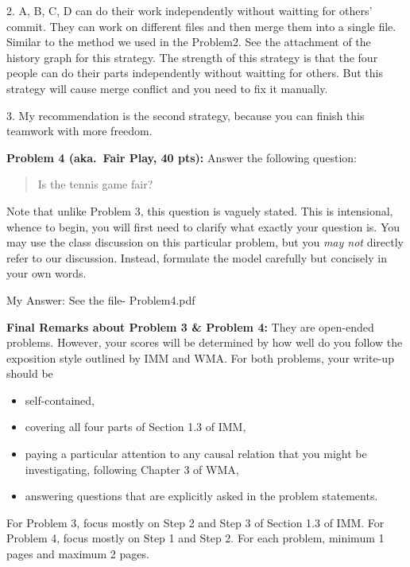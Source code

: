 \documentclass[12pt]{article}
\begin{document}
2. A, B, C, D can do their work independently without waitting for others' commit. They can work on different files and then merge them into a single file. Similar to the method we used in the Problem2. See the attachment of the history graph for this strategy. The strength of this strategy is that the four people can do their parts independently without waitting for others. But this strategy will cause merge conflict and you need to fix it manually.

3. My recommendation is the second strategy, because you can finish this teamwork with more freedom.

\vskip0.25in
\noindent\textbf{Problem 4 (aka.\ Fair Play, 40 pts):}
Answer the following question:
\begin{verse}
Is the tennis game fair?
\end{verse}
Note that unlike Problem 3, this question is vaguely stated.
This is intensional, whence to begin, you will first need to clarify
what exactly your question is.
You may use the class discussion on this particular 
problem, but you \emph{may not} directly refer to our 
discussion.  Instead, formulate the model carefully but concisely in 
your own words.   

My Answer: See the file- Problem4.pdf

\vskip0.25in
\noindent\textbf{Final Remarks about Problem 3 \& Problem 4:} 
They are open-ended problems.  However, your scores will be determined
by how well do you follow the exposition style outlined by IMM and
WMA.  For both problems, your write-up should be 
\begin{itemize}
\item self-contained,
\item covering all four parts of Section 1.3 of IMM,
\item paying a particular attention to any causal relation that you
  might be investigating, following Chapter 3 of WMA,
\item answering questions that are explicitly asked in the problem statements.
\end{itemize}
For Problem 3, focus mostly on Step 2 and Step 3 of Section
1.3 of IMM.  For Problem 4, focus mostly on Step 1 and Step
2.  For each problem, minimum 1 pages and maximum 2 pages.
\end{document}
